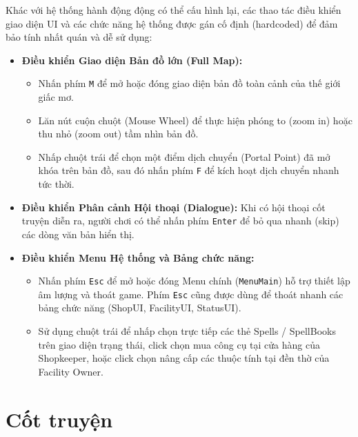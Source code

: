 \documentclass[../DoAn.tex]{subfiles}
\begin{document}
Khác với hệ thống hành động động có thể cấu hình lại, các thao tác điều khiển giao diện UI và các chức năng hệ thống được gán cố định (hardcoded) để đảm bảo tính nhất quán và dễ sử dụng:
\begin{itemize}
    \item \textbf{Điều khiển Giao diện Bản đồ lớn (Full Map):}
    \begin{itemize}
        \item Nhấn phím \texttt{M} để mở hoặc đóng giao diện bản đồ toàn cảnh của thế giới giấc mơ.
        \item Lăn nút cuộn chuột (Mouse Wheel) để thực hiện phóng to (zoom in) hoặc thu nhỏ (zoom out) tầm nhìn bản đồ.
        \item Nhấp chuột trái để chọn một điểm dịch chuyển (Portal Point) đã mở khóa trên bản đồ, sau đó nhấn phím \texttt{F} để kích hoạt dịch chuyển nhanh tức thời.
    \end{itemize}
    \item \textbf{Điều khiển Phân cảnh Hội thoại (Dialogue):} Khi có hội thoại cốt truyện diễn ra, người chơi có thể nhấn phím \texttt{Enter} để bỏ qua nhanh (skip) các dòng văn bản hiển thị.
    \item \textbf{Điều khiển Menu Hệ thống và Bảng chức năng:} 
    \begin{itemize}
        \item Nhấn phím \texttt{Esc} để mở hoặc đóng Menu chính (\texttt{MenuMain}) hỗ trợ thiết lập âm lượng và thoát game. Phím \texttt{Esc} cũng được dùng để thoát nhanh các bảng chức năng (ShopUI, FacilityUI, StatusUI).
        \item Sử dụng chuột trái để nhấp chọn trực tiếp các thẻ Spells / SpellBooks trên giao diện trạng thái, click chọn mua công cụ tại cửa hàng của Shopkeeper, hoặc click chọn nâng cấp các thuộc tính tại đền thờ của Facility Owner.
    \end{itemize}
\end{itemize}

\section{Cốt truyện}
\label{section:3.5}
\end{document}
